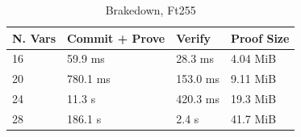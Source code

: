 \begin{table}[H]
\centering
\renewcommand{\arraystretch}{0.6}
\setlength{\tabcolsep}{5pt}
\begin{tabular}{ l l l l }
N. Vars & Commit + Prove & Verify & Proof Size  \\
\hline
16 & 59.9 ms & 28.3 ms & 4.04 MiB  \\
20 & 780.1 ms & 153.0 ms & 9.11 MiB \\
24 & 11.3 s & 420.3 ms & 19.3 MiB \\
28 & 186.1 s & 2.4 s & 41.7 MiB \\
\end{tabular}
\captionsetup{skip=5pt}
\caption{Brakedown, Ft255}

\end{table}